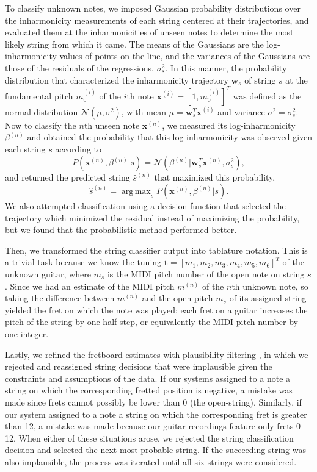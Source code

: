 \documentclass[convention,peer-reviewed]{aesconf}
\DeclareMathOperator*{\argmax}{arg\,max}
\begin{document}
To classify unknown notes, we imposed Gaussian probability distributions over the inharmonicity measurements of each string centered at their trajectories, and evaluated them at the inharmonicities of unseen notes to determine the most likely string from which it came. The means of the Gaussians are the log-inharmonicity values of points on the line, and the variances of the Gaussians are those of the residuals of the regressions, $\sigma_s^2$. In this manner, the probability distribution that characterized the inharmonicity trajectory $\mathbf{w}_s$ of string $s$ at the fundamental pitch $m_0^{(i)}$ of the $i$th note $\mathbf{x}^{(i)} = [1,m_0^{(i)}]^T$ was defined as the normal distribution $\mathcal{N}(\mu, \sigma^2)$, with mean $\mu = \mathbf{w}_s^T\mathbf{x}^{(i)}$ and variance $\sigma^2 = \sigma_s^2$. Now to classify the $n$th unseen note $\mathbf{x}^{(n)}$, we measured its log-inharmonicity $\beta^{(n)}$ and obtained the probability that this log-inharmonicity was observed given each string $s$ according to
\begin{equation}
P(\mathbf{x}^{(n)},\beta^{(n)} | s) = \mathcal{N}(\beta^{(n)} | \mathbf{w}_s^T\mathbf{x}^{(n)},\sigma_s^2),
\end{equation}
and returned the predicted string $\hat{s}^{(n)}$ that maximized this probability,
\begin{equation}
\hat{s}^{(n)} = \argmax_{s}P(\mathbf{x}^{(n)},\beta^{(n)} | s).
\label{eq:string-argmax}
\end{equation}
We also attempted classification using a decision function that selected the trajectory which minimized the residual instead of maximizing the probability, but we found that the probabilistic method performed better.

Then, we transformed the string classifier output into tablature notation. This is a trivial task because we know the tuning $\mathbf{t} = [m_1, m_2, m_3, m_4, m_5, m_6]^T$ of the unknown guitar, where $m_s$ is the MIDI pitch number of the open note on string $s$. Since we had an estimate of the MIDI pitch $m^{(n)}$ of the $n$th unknown note, so taking the difference between $m^{(n)}$ and the open pitch $m_s$ of its assigned string yielded the fret on which the note was played; each fret on a guitar increases the pitch of the string by one half-step, or equivalently the MIDI pitch number by one integer.

Lastly, we refined the fretboard estimates with plausibility filtering \citep{abesser2012}, in which we rejected and reassigned string decisions that were implausible given the constraints and assumptions of the data. If our systems assigned to a note a string on which the corresponding fretted position is negative, a mistake was made since frets cannot possibly be lower than 0 (the open-string). Similarly, if our system assigned to a note a string on which the corresponding fret is greater than 12, a mistake was made because our guitar recordings feature only frets 0-12. When either of these situations arose, we rejected the string classification decision and selected the next most probable string. If the succeeding string was also implausible, the process was iterated until all six strings were considered.
\end{document}
